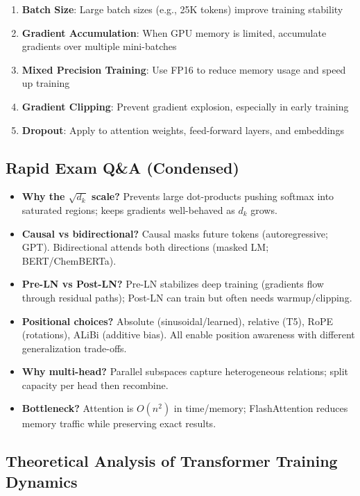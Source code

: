 \begin{enumerate}
    \item \textbf{Batch Size}: Large batch sizes (e.g., 25K tokens) improve training stability
    \item \textbf{Gradient Accumulation}: When GPU memory is limited, accumulate gradients over multiple mini-batches
    \item \textbf{Mixed Precision Training}: Use FP16 to reduce memory usage and speed up training
    \item \textbf{Gradient Clipping}: Prevent gradient explosion, especially in early training
    \item \textbf{Dropout}: Apply to attention weights, feed-forward layers, and embeddings
\end{enumerate}

\subsection{Rapid Exam Q\&A (Condensed)}
\begin{itemize}[leftmargin=1.5em]
    \item \textbf{Why the $\sqrt{d_k}$ scale?} Prevents large dot-products pushing softmax into saturated regions; keeps gradients well-behaved as $d_k$ grows.
    \item \textbf{Causal vs bidirectional?} Causal masks future tokens (autoregressive; GPT). Bidirectional attends both directions (masked LM; BERT/ChemBERTa).
    \item \textbf{Pre-LN vs Post-LN?} Pre-LN stabilizes deep training (gradients flow through residual paths); Post-LN can train but often needs warmup/clipping.
    \item \textbf{Positional choices?} Absolute (sinusoidal/learned), relative (T5), RoPE (rotations), ALiBi (additive bias). All enable position awareness with different generalization trade-offs.
    \item \textbf{Why multi-head?} Parallel subspaces capture heterogeneous relations; split capacity per head then recombine.
    \item \textbf{Bottleneck?} Attention is $O(n^2)$ in time/memory; FlashAttention reduces memory traffic while preserving exact results.
\end{itemize}

\subsection{Theoretical Analysis of Transformer Training Dynamics}

